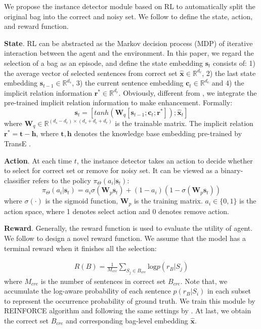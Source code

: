 \documentclass{article}
\begin{document}
We propose the instance detector module based on RL to automatically split the original bag into the correct and noisy set. We follow \cite{Feng2018Reinforcement} to define the state, action, and reward function.

\textbf{State}. RL can be abstracted as the Markov decision process (MDP) of iterative interaction between the agent and the environment. In this paper, we regard the selection of a bag as an episode, and define the state embedding $\mathbf{s}_t$ consists of: 1) the average vector of selected sentences from correct set $\mathbf{\hat{x}}\in\mathbb{R}^{d_c}$, 2) the last state embedding $\mathbf{s}_{t-1}\in\mathbb{R}^{d_s}$, 3) the current sentence embedding $\mathbf{c}_t\in\mathbb{R}^{d_c}$ and 4) the implicit relation information $\mathbf{r}^*\in\mathbb{R}^{d_r}$. Obviously, different from \cite{Feng2018Reinforcement,he2019improving,Qin2018Robust}, we integrate the pre-trained implicit relation information to make enhancement. Formally:
\begin{equation}
\mathbf{s}_t = [tanh(\mathbf{W}_q[\mathbf{s}_{t-1}; \mathbf{c}_{t}; \mathbf{r}^*]); \mathbf{\hat{x}}_t]
\label{eq3}
\end{equation}
where $\mathbf{W}_q\in\mathbb{R}^{(d_s-d_c)\times(d_s+d_c+d_r)}$ is the trainable matrix. The implicit relation $\mathbf{r}^*=\mathbf{t-h}$, where $\mathbf{t,h}$ denotes the knowledge base embedding pre-trained by TransE \cite{Fan2014Transition}.


\textbf{Action}. At each time $t$, the instance detector takes an action to decide whether to select for correct set or remove for noisy set. It can be viewed as a binary-classifier refers to the policy $\pi_{\Theta} (a_i|\mathbf{s}_t)$:
\begin{equation}
\pi_{\Theta} (a_i|\mathbf{s}_t) = a_i\sigma (\mathbf{W}_p\mathbf{s}_t) + (1-a_i)(1-\sigma (\mathbf{W}_p\mathbf{s}_t))
\label{eq4}
\end{equation}
where $\sigma(\cdot)$ is the sigmoid function, $\mathbf{W}_p$ is the training matrix. $a_i\in\{0,1\}$ is the action space, where 1 denotes select action and 0 denotes remove action.

\textbf{Reward}. Generally, the reward function is used to evaluate the utility of agent. We follow \cite{Feng2018Reinforcement} to design a novel reward function. We assume that the model has a terminal reward when it finishes all the selection:


\begin{equation}
\begin{aligned}
R(B) = \frac{1}{M_{cre}}\sum_{S_j\in B_{cre}}\text{log}p(r_B|S_j)
\label{eq5}
\end{aligned}
\end{equation}
where $M_{cre}$ is the number of sentences in correct set $B_{cre}$. Note that, we accumulate the log-aware probability of each sentence $p(r_B|S_i)$ in each subset to represent the occurrence probability of ground truth. We train this module by REINFORCE algorithm \cite{williams1992simple} and following the same settings by \cite{Feng2018Reinforcement}. At last, we obtain the correct set $B_{cre}$ and corresponding bag-level embedding $\mathbf{\hat{x}}$.
\end{document}
